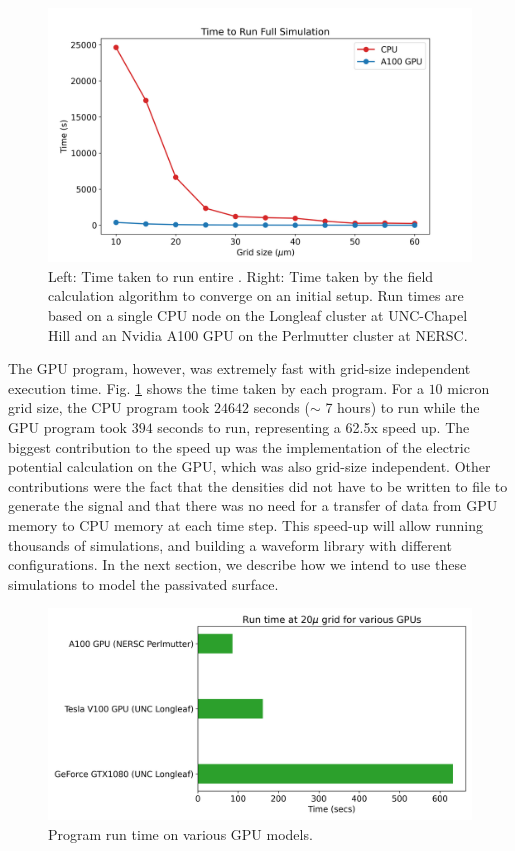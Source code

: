 \begin{figure}
\centering
 \includegraphics[width=0.99\linewidth]{ch4/figs/cpu_gpu_comp.png}
\caption{\label{fig:GPU_time} Left: Time taken to run entire {\tdsim}. Right: Time taken by the field calculation algorithm to converge on an initial setup. Run times are based on a single CPU node on the Longleaf cluster at UNC-Chapel Hill and an Nvidia A100 GPU on the Perlmutter cluster at NERSC.}
\end{figure}


The GPU program, however, was extremely fast with grid-size independent execution time. Fig. \ref{fig:GPU_time} shows the time taken by each program. For a $10$ micron grid size, the CPU program took $24642$ seconds ($\sim$ 7 hours) to run while the GPU program took $394$ seconds to run, representing a 62.5x speed up. The biggest contribution to the speed up was the implementation of the electric potential calculation on the GPU, which was also grid-size independent. Other contributions were the fact that the densities did not have to be written to file to generate the signal and that there was no need for a transfer of data from GPU memory to CPU memory at each time step. This speed-up will allow running thousands of simulations, and building a waveform library with different configurations. In the next section, we describe how we intend to use these simulations to model the passivated surface.


 \begin{figure}
    \centering
    \includegraphics[width=0.99\linewidth]{ch4/figs/gpu_comp.png}
\caption{\label{fig:GPU_comp} Program run time on various GPU models.}
\end{figure}


